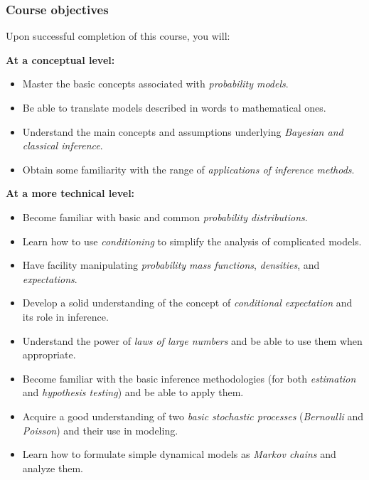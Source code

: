 \documentclass[pdftex, brazil, 12pt, twoside]{article}
\begin{document}
\subsubsection{Course objectives}
\label{ovw0-ci-obj}

Upon successful completion of this course, you will:

\textbf{At a conceptual level:}

\begin{itemize}[noitemsep]
\item Master the basic concepts associated with \emph{probability models}.
\item Be able to translate models described in words to mathematical ones.
\item Understand the main concepts and assumptions underlying \emph{Bayesian and classical inference}.
\item Obtain some familiarity with the range of \emph{applications of inference methods}.
\end{itemize}

\textbf{At a more technical level:}

\begin{itemize}[noitemsep]
\item Become familiar with basic and common \emph{probability distributions}.
\item Learn how to use \emph{conditioning} to simplify the analysis of complicated models.
\item Have facility manipulating \emph{probability mass functions}, \emph{densities}, and \emph{expectations}.
\item Develop a solid understanding of the concept of \emph{conditional expectation} and its role in inference.
\item Understand the power of \emph{laws of large numbers} and be able to use them when appropriate.
\item Become familiar with the basic inference methodologies (for both \emph{estimation} and \emph{hypothesis testing}) and be able to apply them.
\item Acquire a good understanding of two \emph{basic stochastic processes} (\emph{Bernoulli} and \emph{Poisson}) and their use in modeling.
\item Learn how to formulate simple dynamical models as \emph{Markov chains} and analyze them.
\end{itemize}
\end{document}
